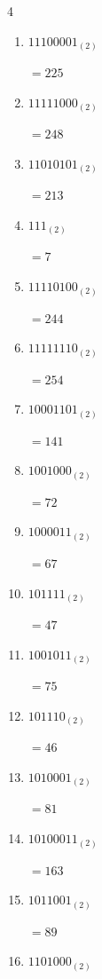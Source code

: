 \begin{multicols}{4}
\begin{enumerate}
        $=116$

  \item $11100001_{(2)}$

        $=225$

  \item $11111000_{(2)}$

        $=248$

  \item $11010101_{(2)}$

        $=213$

  \item $111_{(2)}$

        $=7$

  \item $11110100_{(2)}$

        $=244$

\columnbreak %

\resetques

  \item $11111110_{(2)}$

        $=254$

  \item $10001101_{(2)}$

        $=141$

  \item $1001000_{(2)}$

        $=72$

  \item $1000011_{(2)}$

        $=67$

  \item $101111_{(2)}$

        $=47$

  \item $1001011_{(2)}$

        $=75$

  \item $101110_{(2)}$

        $=46$

  \item $1010001_{(2)}$

        $=81$

  \item $10100011_{(2)}$

        $=163$

  \item $1011001_{(2)}$

        $=89$

  \item $1101000_{(2)}$


\end{enumerate}
\end{multicols}
